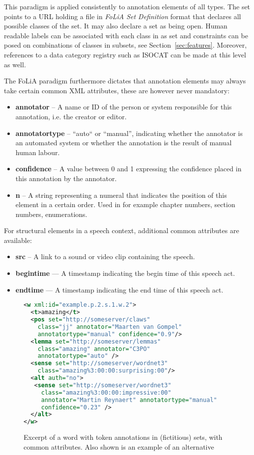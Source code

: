\documentclass[a4paper,10pt,twoside]{article}
\begin{document}
This paradigm is applied consistently to annotation elements of all types. The
set points to a URL holding a file in \emph{FoLiA Set Definition} format that
declares all possible classes of the set. It may also declare a set as being
open. Human readable labels can be associated with each class in as set and
constraints can be posed on combinations of classes in subsets, see
Section~\ref{sec:features}. Moreover, references to a data category registry
such as ISOCAT \cite{ISOCAT} can be made at this level as well.

The FoLiA paradigm furthermore dictates that annotation elements may always take certain
common XML attributes, these are however never mandatory:

\begin{itemize}
\item \textbf{annotator} -- A name or ID of the person or system responsible for this annotation, i.e. the creator or editor.
\item \textbf{annotatortype} -- ``auto`` or ``manual'', indicating whether the annotator is an automated system or whether the annotation is the result of manual human labour.
\item \textbf{confidence} -- A value between 0 and 1 expressing the confidence placed in this annotation by the annotator.
\item \textbf{n} -- A string representing a numeral that indicates the position of this element in a certain order. Used in for example chapter numbers, section numbers, enumerations.
\end{itemize}

For structural elements in a speech context, additional common attributes are
available:

\begin{itemize}
  \item \textbf{src} -- A link to a sound or video clip containing the speech.
  \item \textbf{begintime} --- A timestamp indicating the begin time of this speech act.
  \item \textbf{endtime} --- A timestamp indicating the end time of this speech act.
\end{itemize}

\begin{figure}[tbh]
\begin{lstlisting}[language=xml]
<w xml:id="example.p.2.s.1.w.2">
  <t>amazing</t>
  <pos set="http://someserver/claws" 
    class="jj" annotator="Maarten van Gompel"
    annotatortype="manual" confidence="0.9"/>
  <lemma set="http://someserver/lemmas"
    class="amazing" annotator="C3PO" 
    annotatortype="auto" />
  <sense set="http://someserver/wordnet3"
    class="amazing%3:00:00:surprising:00"/>
  <alt auth="no">
   <sense set="http://someserver/wordnet3"
     class="amazing%3:00:00:impressive:00"
     annotator="Martin Reynaert" annotatortype="manual"
     confidence="0.23" />
  </alt>
</w> 
\end{lstlisting}
\caption{Excerpt of a word with token annotations in (fictitious) sets, with common attributes. Also shown is an example of an alternative\label{fig:wordannotation}} 
\end{figure}
\end{document}
